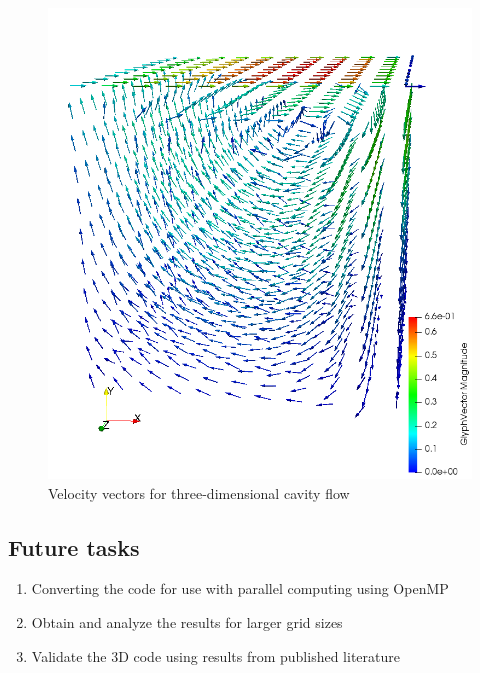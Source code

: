 \documentclass[12pt,a4paper,fleqn]{article}
\begin{document}
\begin{figure}[H]
    \centering
    \includegraphics[width=\linewidth]{3d_quick_velVectors.png}
    \caption{Velocity vectors for three-dimensional cavity flow}
\end{figure}

\subsection{Future tasks}
\begin{enumerate}
    \item Converting the code for use with parallel computing using OpenMP
    \item Obtain and analyze the results for larger grid sizes
    \item Validate the 3D code using results from published literature
\end{enumerate}
\end{document}
